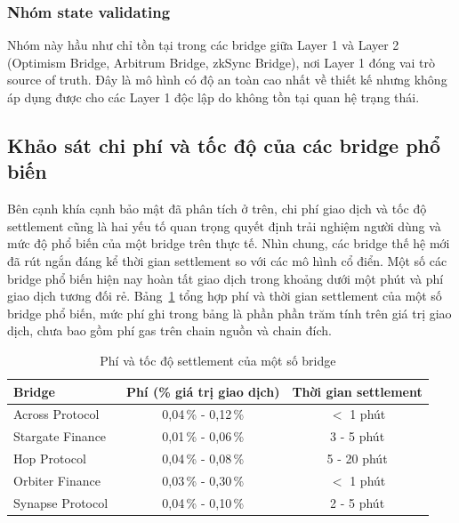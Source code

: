 \subsubsection*{Nhóm state validating}

Nhóm này hầu như chỉ tồn tại trong các bridge giữa Layer 1 và Layer 2 
(Optimism Bridge, Arbitrum Bridge, zkSync Bridge), nơi Layer 1 
đóng vai trò source of truth. Đây là mô hình có độ an toàn cao nhất về thiết kế nhưng
không áp dụng được cho các Layer 1 độc lập do không tồn tại quan hệ trạng thái.

\subsection{Khảo sát chi phí và tốc độ của các bridge phổ biến}
\label{sec:bridge-cost-speed}

Bên cạnh khía cạnh bảo mật đã phân tích ở trên, chi phí giao dịch và tốc độ
settlement cũng là hai yếu tố quan trọng quyết định trải nghiệm người dùng và
mức độ phổ biến của một bridge trên thực tế.
Nhìn chung, các bridge thế hệ mới đã rút ngắn đáng kể thời gian settlement so
với các mô hình cổ điển. Một số các bridge phổ biến hiện nay hoàn tất giao dịch trong
khoảng dưới một phút và phí giao dịch tương đối rẻ. Bảng~\ref{tab:bridge-cost-speed} tổng hợp phí và thời gian settlement của một
số bridge phổ biến, mức
phí ghi trong bảng là phần phần trăm tính trên giá trị giao dịch, chưa bao gồm
phí gas trên chain nguồn và chain đích.

\begin{table}[H]
    \centering
    \caption{Phí và tốc độ settlement của một số bridge}
    \label{tab:bridge-cost-speed}
    \begin{tabular}{|l|c|c|}
        \hline
        \textbf{Bridge} & \textbf{Phí (\% giá trị giao dịch)} & \textbf{Thời gian settlement} \\
        \hline
        Across Protocol~\cite{across_docs}   & 0{,}04\,\% - 0{,}12\,\% & $<$ 1 phút \\
        \hline
        Stargate Finance~\cite{stargate_docs} & 0{,}01\,\% - 0{,}06\,\% & 3 - 5 phút \\
        \hline
        Hop Protocol~\cite{hop_docs}         & 0{,}04\,\% - 0{,}08\,\% & 5 - 20 phút \\
        \hline
        Orbiter Finance~\cite{orbiter_docs}  & 0{,}03\,\% - 0{,}30\,\% & $<$ 1 phút \\
        \hline
        Synapse Protocol~\cite{synapse_docs} & 0{,}04\,\% - 0{,}10\,\% & 2 - 5 phút \\
        \hline
    \end{tabular}
\end{table}

